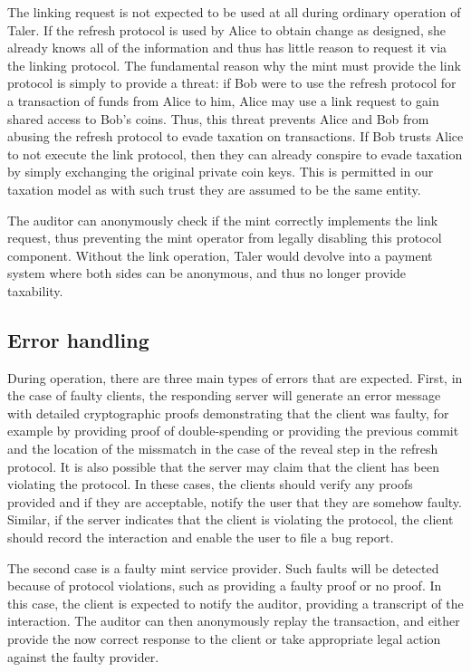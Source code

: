 \documentclass{llncs}
\begin{document}
The linking request is not expected to be used at all during ordinary
operation of Taler.  If the refresh protocol is used by Alice to
obtain change as designed, she already knows all of the information
and thus has little reason to request it via the linking protocol.
The fundamental reason why the mint must provide the link protocol is
simply to provide a threat: if Bob were to use the refresh protocol
for a transaction of funds from Alice to him, Alice may use a link
request to gain shared access to Bob's coins. Thus, this threat
prevents Alice and Bob from abusing the refresh protocol to evade
taxation on transactions. If Bob trusts Alice to not execute the link
protocol, then they can already conspire to evade taxation by simply
exchanging the original private coin keys.  This is permitted in our
taxation model as with such trust they are assumed to be the same
entity.

The auditor can anonymously check if the mint correctly implements the
link request, thus preventing the mint operator from legally disabling
this protocol component.  Without the link operation, Taler would
devolve into a payment system where both sides can be anonymous, and
thus no longer provide taxability.


\subsection{Error handling}

During operation, there are three main types of errors that are
expected.  First, in the case of faulty clients, the responding server
will generate an error message with detailed cryptographic proofs
demonstrating that the client was faulty, for example by providing
proof of double-spending or providing the previous commit and the
location of the missmatch in the case of the reveal step in the
refresh protocol.  It is also possible that the server may claim that
the client has been violating the protocol.  In these cases, the
clients should verify any proofs provided and if they are acceptable,
notify the user that they are somehow faulty.  Similar, if the
server indicates that the client is violating the protocol, the
client should record the interaction and enable the user to file a
bug report.

The second case is a faulty mint service provider.  Such faults will
be detected because of protocol violations, such as providing
a faulty proof or no proof.  In this case, the client is expected to
notify the auditor, providing a transcript of the interaction.  The
auditor can then anonymously replay the transaction, and either
provide the now correct response to the client or take appropriate
legal action against the faulty provider.
\end{document}
